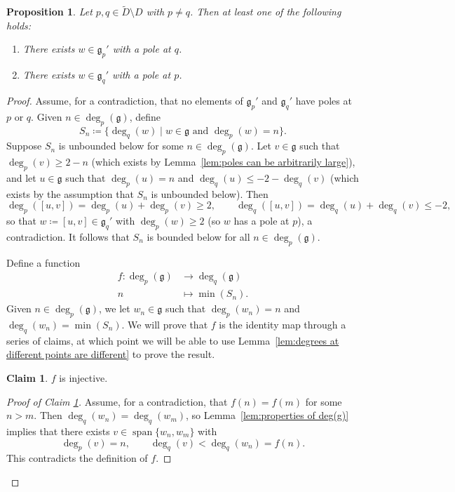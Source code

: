 \documentclass[12pt]{amsart}
\theoremstyle{plain}
\newtheorem{proposition}[theorem]{Proposition}
\theoremstyle{definition}
\newtheorem{claim}{Claim}
\numberwithin{equation}{section}
\def\g{\mathfrak{g}}
\DeclareMathOperator{\spn}{span}
\begin{document}
\begin{proposition}\label{prop:dichotomy of poles at p and q}
    Let $p,q \in \widetilde{D} \setminus D$ with $p \neq q$. Then at least one of the following holds:
    \begin{enumerate}
        \item There exists $w \in \g_p'$ with a pole at $q$.
        \item There exists $w \in \g_q'$ with a pole at $p$.
    \end{enumerate}
\end{proposition}
\begin{proof}
    Assume, for a contradiction, that no elements of $\g_p'$ and $\g_q'$ have poles at $p$ or $q$. Given $n \in \deg_p(\g)$, define
    $$S_n \coloneqq \{\deg_q(w) \mid w \in \g \text{ and } \deg_p(w) = n\}.$$
    Suppose $S_n$ is unbounded below for some $n \in \deg_p(\g)$. Let $v \in \g$ such that $\deg_p(v) \geq 2 - n$ (which exists by Lemma~\ref{lem:poles can be arbitrarily large}), and let $u \in \g$ such that $\deg_p(u) = n$ and $\deg_q(u) \leq -2 - \deg_q(v)$ (which exists by the assumption that $S_n$ is unbounded below). Then
    $$\deg_p([u,v]) = \deg_p(u) + \deg_p(v) \geq 2, \qquad \deg_q([u,v]) = \deg_q(u) + \deg_q(v) \leq -2,$$
    so that $w \coloneqq [u,v] \in \g_q'$ with $\deg_p(w) \geq 2$ (so $w$ has a pole at $p$), a contradiction. It follows that $S_n$ is bounded below for all $n \in \deg_p(\g)$.

    Define a function
    \begin{align*}
        f \colon \deg_p(\g) &\to \deg_q(\g) \\
        n &\mapsto \min(S_n).
    \end{align*}
    Given $n \in \deg_p(\g)$, we let $w_n \in \g$ such that $\deg_p(w_n) = n$ and $\deg_q(w_n) = \min(S_n)$. We will prove that $f$ is the identity map through a series of claims, at which point we will be able to use Lemma~\ref{lem:degrees at different points are different} to prove the result.

    \begin{claim}\label{claim:f is injective}
        $f$ is injective.
    \end{claim}
    \begin{proof}[Proof of Claim \ref{claim:f is injective}]
        Assume, for a contradiction, that $f(n) = f(m)$ for some $n > m$. Then $\deg_q(w_n) = \deg_q(w_m)$, so Lemma~\ref{lem:properties of deg(g)} implies that there exists $v \in \spn\{w_n,w_m\}$ with
        $$\deg_p(v) = n, \qquad \deg_q(v) < \deg_q(w_n) = f(n).$$
        This contradicts the definition of $f$.
    \end{proof}


\end{proof}
\end{document}

